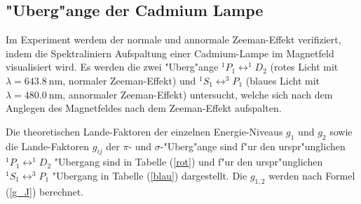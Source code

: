  \subsection{"Uberg"ange der Cadmium Lampe}
    Im Experiment werdem der normale und annormale Zeeman-Effekt verifiziert, indem die Spektraliniern Aufspaltung einer Cadmium-Lampe im Magnetfeld visualisiert wird.
    Es werden die zwei "Uberg"ange $^1P_1 \leftrightarrow ^1D_2$ (rotes Licht mit $\lambda = \SI{643,8}{\nano \meter}$, normaler Zeeman-Effekt) und $^1S_1 \leftrightarrow ^3P_1$ (blaues Licht mit $\lambda = \SI{480,0}{\nano \meter}$, annormaler Zeeman-Effekt) untersucht, welche sich nach dem Anglegen des Magnetfeldes nach dem Zeeman-Effekt aufspalten.

    Die theoretischen Lande-Faktoren der einzelnen Energie-Niveaus $g_1$ und $g_2$ sowie die Lande-Faktoren $g_{ij}$ der $\pi$- und $\sigma$-"Uberg"ange sind f"ur den urspr"unglichen $^1P_1 \leftrightarrow ^1D_2$ "Ubergang sind in Tabelle (\ref{rot}) und f"ur den urspr"unglichen $^1S_1 \leftrightarrow ^3P_1$ "Ubergang  in Tabelle (\ref{blau}) dargestellt.
    Die $g_{1,2}$ werden nach Formel (\ref{g_J}) berechnet.

